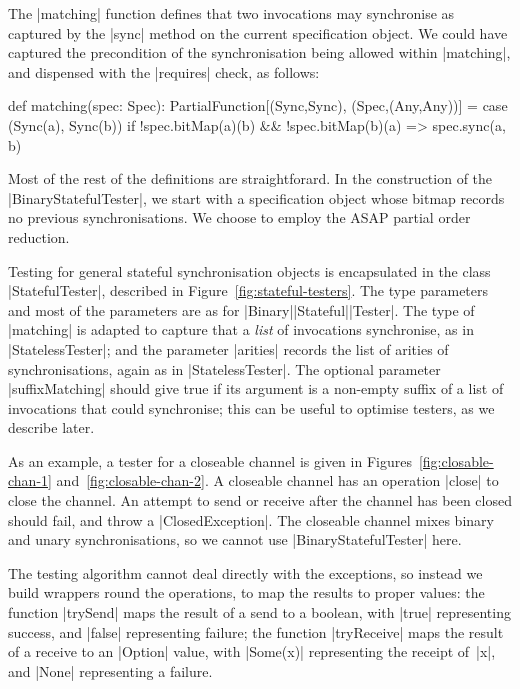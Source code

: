 The |matching| function defines that two invocations may synchronise as
captured by the |sync| method on the current specification object.   
We could have captured the precondition of the synchronisation being allowed
within |matching|, and dispensed with the |requires| check, as follows:
%
\begin{scala}
  def matching(spec: Spec): PartialFunction[(Sync,Sync), (Spec,(Any,Any))] = {
    case (Sync(a), Sync(b)) if !spec.bitMap(a)(b) && !spec.bitMap(b)(a) => 
      spec.sync(a, b) 
  }
\end{scala}

Most of the rest of the definitions are straightforard.  In the construction
of the |BinaryStatefulTester|, we start with a specification object whose
bitmap records no previous synchronisations.  We choose to employ the ASAP
partial order reduction.


Testing for general stateful synchronisation objects is encapsulated in the
class |StatefulTester|, described in Figure~\ref{fig:stateful-testers}.
The type parameters and most of the parameters are as for
|Binary|\-|Stateful|\-|Tester|.  The type of |matching| is adapted to capture
that a \emph{list} of invocations synchronise, as in |StatelessTester|; and
the parameter |arities| records the list of arities of synchronisations, again
as in |StatelessTester|.  The optional parameter |suffixMatching| should give
true if its argument is a non-empty suffix of a list of invocations that could
synchronise; this can be useful to optimise testers, as we describe later.


As an example, a tester for a closeable channel is given in
Figures~\ref{fig:closable-chan-1} and~\ref{fig:closable-chan-2}.  A closeable
channel has an operation |close| to close the channel.  An attempt to send or
receive after the channel has been closed should fail, and throw a
|ClosedException|.  The closeable channel mixes binary and unary
synchronisations, so we cannot use |BinaryStatefulTester| here.

The testing algorithm cannot deal directly with the exceptions, so instead we
build wrappers round the operations, to map the results to proper values: the
function |trySend| maps the result of a send to a boolean, with |true|
representing success, and |false| representing failure; the function
|tryReceive| maps the result of a receive to an |Option| value, with |Some(x)|
representing the receipt of~|x|, and |None| representing a failure.

